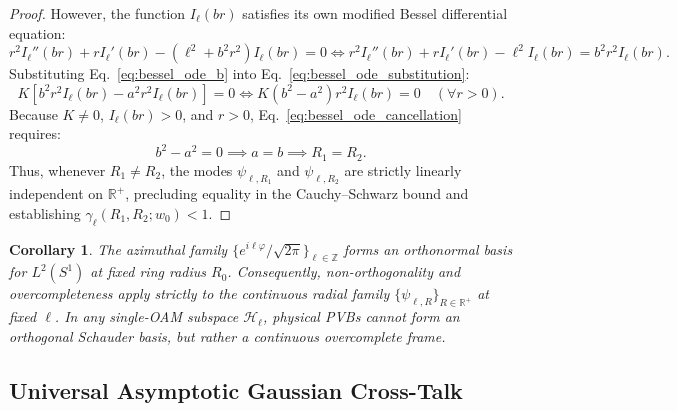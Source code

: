 \documentclass{optica-article}
\newtheorem{corollary}{Corollary}
\begin{document}
\begin{proof}
However, the function $I_\ell(b r)$ satisfies its own modified Bessel differential equation:
\begin{equation}
r^2 I_\ell''(b r) + r I_\ell'(b r) - (\ell^2 + b^2 r^2) I_\ell(b r) = 0 \iff r^2 I_\ell''(b r) + r I_\ell'(b r) - \ell^2 I_\ell(b r) = b^2 r^2 I_\ell(b r).
\label{eq:bessel_ode_b}
\end{equation}
Substituting Eq.~\eqref{eq:bessel_ode_b} into Eq.~\eqref{eq:bessel_ode_substitution}:
\begin{equation}
K \left[ b^2 r^2 I_\ell(b r) - a^2 r^2 I_\ell(b r) \right] = 0 \iff K (b^2 - a^2) r^2 I_\ell(b r) = 0 \quad (\forall r > 0).
\label{eq:bessel_ode_cancellation}
\end{equation}
Because $K \neq 0$, $I_\ell(b r) > 0$, and $r > 0$, Eq.~\eqref{eq:bessel_ode_cancellation} requires:
\begin{equation}
b^2 - a^2 = 0 \implies a = b \implies R_1 = R_2.
\label{eq:ode_conclusion}
\end{equation}
Thus, whenever $R_1 \neq R_2$, the modes $\psi_{\ell, R_1}$ and $\psi_{\ell, R_2}$ are strictly linearly independent on $\mathbb{R}^+$, precluding equality in the Cauchy--Schwarz bound and establishing $\gamma_\ell(R_1, R_2; w_0) < 1$.
\end{proof}

\begin{corollary}
The azimuthal family $\{e^{i\ell\varphi}/\sqrt{2\pi}\}_{\ell \in \mathbb{Z}}$ forms an orthonormal basis for $L^2(S^1)$ at fixed ring radius $R_0$. Consequently, non-orthogonality and overcompleteness apply strictly to the continuous radial family $\{\psi_{\ell, R}\}_{R \in \mathbb{R}^+}$ at fixed $\ell$. In any single-OAM subspace $\mathcal{H}_\ell$, physical PVBs cannot form an orthogonal Schauder basis, but rather a continuous overcomplete frame.
\end{corollary}

\subsection{Universal Asymptotic Gaussian Cross-Talk}
\end{document}
